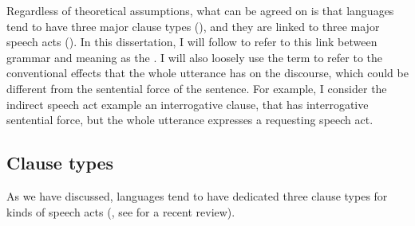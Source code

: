 Regardless of theoretical assumptions, what can be agreed on is that languages tend to have three major clause types (\diis{}), and they are linked to three major speech acts (\aqrs{}). In this dissertation, I will follow \textcite{chierchia1990textbook} to refer to this link between grammar and meaning as the . I will also loosely use the term  to refer to the conventional effects that the whole utterance has on the discourse, which could be different from the sentential force of the sentence. For example, I consider the indirect speech act example  an interrogative clause, that has interrogative sentential force, but the whole utterance expresses a requesting speech act. 




\subsection{Clause types}
\label{sec:bg:theory:clause}

As we have discussed, languages tend to have dedicated three clause types for kinds of speech acts (\citealt{sz1985speechact, konig2007, aikhenvald2016, portner2018}, see \cite{konig2020} for a recent review).

